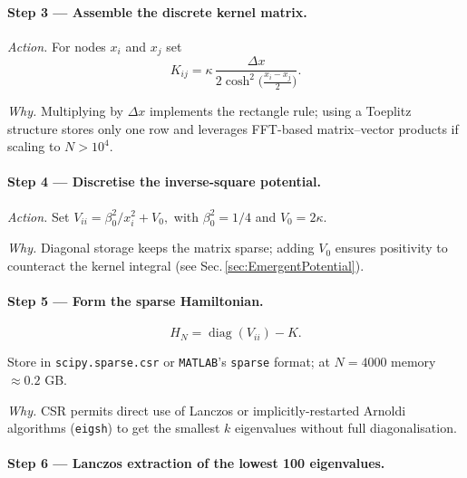 \documentclass[11pt]{article}
\begin{document}
\vspace{0.4em}
\paragraph{Step 3 — Assemble the discrete kernel matrix.}

\emph{Action.}\;  
For nodes \(x_i\) and \(x_j\) set  
\[
   K_{ij}
   = \kappa\,\frac{\Delta x}
     {2\cosh^{2}\!\bigl(\tfrac{x_i-x_j}{2}\bigr)}.
\]

\emph{Why.}\;  
Multiplying by \(\Delta x\) implements the rectangle rule;
using a Toeplitz structure stores only one row and leverages FFT-based
matrix–vector products if scaling to \(N>10^4\).

\vspace{0.4em}
\paragraph{Step 4 — Discretise the inverse-square potential.}

\emph{Action.}\;  
Set  
\(
   V_{ii}
   = \beta_{0}^{2}/x_i^{2} + V_{0},
\)
with \(\beta_{0}^{2}=1/4\) and \(V_{0}=2\kappa\).

\emph{Why.}\;  
Diagonal storage keeps the matrix sparse;  
adding \(V_{0}\) ensures positivity to counteract the kernel integral
(see Sec.\,\ref{sec:EmergentPotential}).

\vspace{0.4em}
\paragraph{Step 5 — Form the sparse Hamiltonian.}

\[
   H_N
   = \operatorname{diag}(V_{ii}) - K.
\]

Store in \texttt{scipy.sparse.csr} or \texttt{MATLAB}’s
\texttt{sparse} format;  at \(N=4000\) memory $\approx 0.2$ GB.

\emph{Why.}\;  
CSR permits direct use of Lanczos or implicitly-restarted Arnoldi
algorithms (\texttt{eigsh}) to get the smallest $k$ eigenvalues
without full diagonalisation.

\vspace{0.4em}
\paragraph{Step 6 — Lanczos extraction of the lowest 100 eigenvalues.}
\end{document}
